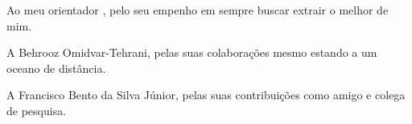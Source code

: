 
\begin{agradecimentos}

Ao meu orientador \imprimirorientador, pelo seu empenho em sempre buscar extrair o melhor de mim.

A Behrooz Omidvar-Tehrani, pelas suas colaborações mesmo estando a um oceano de distância.

A Francisco Bento da Silva Júnior, pelas suas contribuições como amigo e colega de pesquisa.

\end{agradecimentos}